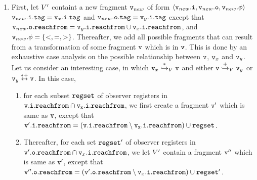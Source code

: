 \begin{enumerate}
  \item
    First, let $V'$ containt a new fragment $\mathtt{v}_{new}$ of form
    $\left\langle\mathtt{v}_{new}.\mathtt{i},\mathtt{v}_{new}.\mathtt{o},\mathtt{v}_{new}.\phi\right\rangle$
    $\mathtt{v}_{new}.\mathtt{i}.\mathtt{tag} = \mathtt{v}_x.\mathtt{i}.\mathtt{tag}$ and $\mathtt{v}_{new}.\mathtt{o}.\mathtt{tag} = \mathtt{v}_y.\mathtt{i}.\mathtt{tag}$ except that $\mathtt{v}_{new}.\mathtt{o}.\mathtt{reachfrom} = \mathtt{v}_y.\mathtt{i}.\mathtt{reachfrom} \cup \mathtt{v}_x.\mathtt{i}.\mathtt{reachfrom}$,
    and $\mathtt{v}_{new}.\phi = \left\{<,=,>\right\}$.
Thereafter, we add all possible fragments that can result from a transformation
of some fragment $\mathtt{v}$ which is in $\mathtt{v}$. This is done by an exhaustive
case analysis on the possible
relationship between $\mathtt{v}$, $\mathtt{v}_x$ and $\mathtt{v}_y$.
Let us consider an interesting case, in which
$\mathtt{v}_x \overset{*}\hookrightarrow_{V} \mathtt{v}$ and either $\mathtt{v} \overset{+}\hookrightarrow_{V} \mathtt{v}_y$ or $\mathtt{v}_y \overset{*+}\leftrightarrow \mathtt{v}$.
In this case,
\begin{enumerate}
\item
  for each subset $\mathtt{regset}$ of observer registers in $\tt \mathtt{v}.\mathtt{i}.\mathtt{reachfrom} \cap \mathtt{v}_x.\mathtt{i}.\mathtt{reachfrom}$, we first create
  a fragment $\mathtt{v}'$ which is same as $\mathtt{v}$, except that $\mathtt{v}'.\mathtt{i}.\mathtt{reachfrom} = (\tt \mathtt{v}.\mathtt{i}.\mathtt{reachfrom} \setminus \mathtt{v}_x.\mathtt{i}.\mathtt{reachfrom}) \cup \mathtt{regset}$.
\item
  Thereafter, 
for each set $\mathtt{regset}'$ of observer registers in $\mathtt{v}'.\mathtt{o}.\mathtt{reachfrom} \cap \mathtt{v}_x.\mathtt{i}.\mathtt{reachfrom}$,  we let $V'$ contain a fragment
$\mathtt{v}''$ which is same as $\mathtt{v}'$, except that $\mathtt{v}''.\mathtt{o}.\mathtt{reachfrom} = (\mathtt{v}'.\mathtt{o}.\mathtt{reachfrom} \setminus \mathtt{v}_x.\mathtt{i}.\mathtt{reachfrom}) \cup \mathtt{regset}'$. 
\end{enumerate}
\end{enumerate}


